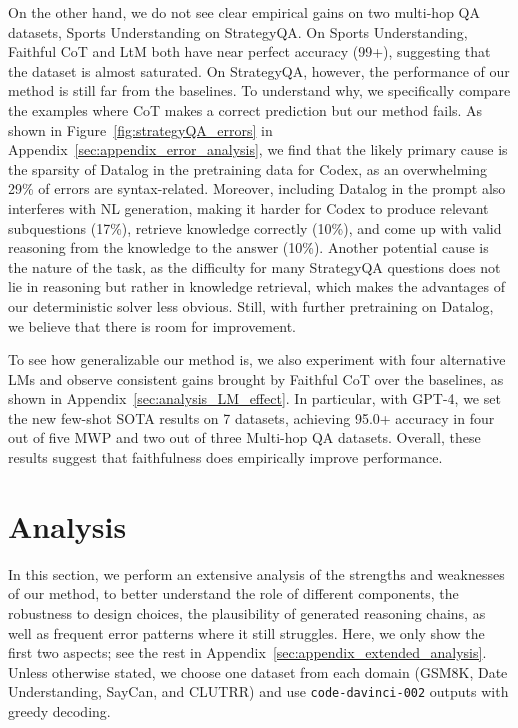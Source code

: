 \documentclass[11pt]{article}
\begin{document}
On the other hand, we do not see clear empirical gains on two multi-hop QA datasets, Sports Understanding on StrategyQA. On Sports Understanding, Faithful CoT and LtM both have near perfect accuracy (99+), suggesting that the dataset is almost saturated. On StrategyQA, however, the performance of our method is still far from the baselines. To understand why, we specifically compare the examples where CoT makes a correct prediction but our method fails. As shown in Figure~\ref{fig:strategyQA_errors} in Appendix~\ref{sec:appendix_error_analysis}, we find that the likely primary cause is the sparsity of Datalog in the pretraining data for Codex, as an overwhelming 29\% of errors are syntax-related. Moreover, including Datalog in the prompt also interferes with NL generation, making it harder for Codex to produce relevant subquestions (17\%), retrieve knowledge correctly (10\%), and come up with valid reasoning from the knowledge to the answer (10\%). Another potential cause is the nature of the task, as the difficulty for many StrategyQA questions does not lie in reasoning but rather in knowledge retrieval, which makes the advantages of our deterministic solver less obvious. Still, with further pretraining on Datalog, we believe that there is room for improvement.

To see how generalizable our method is, we also experiment with four alternative LMs and observe consistent gains brought by Faithful CoT over the baselines, as shown in Appendix~\ref{sec:analysis_LM_effect}. In particular, with GPT-4, we set the new few-shot SOTA results on 7 datasets, achieving 95.0+ accuracy in four out of five MWP and two out of three Multi-hop QA datasets. Overall, these results suggest that faithfulness does empirically improve performance.


\section{Analysis}
\label{sec:analysis} 

In this section, we perform an extensive analysis of the strengths and weaknesses of our method, to better understand the role of different components, the robustness to design choices, the plausibility of generated reasoning chains, as well as frequent error patterns where it still struggles. Here, we only show the first two aspects; see the rest in Appendix~\ref{sec:appendix_extended_analysis}. Unless otherwise stated, we choose one dataset from each domain (GSM8K, Date Understanding, SayCan, and CLUTRR) and use \texttt{code-davinci-002} outputs with greedy decoding.
\end{document}
